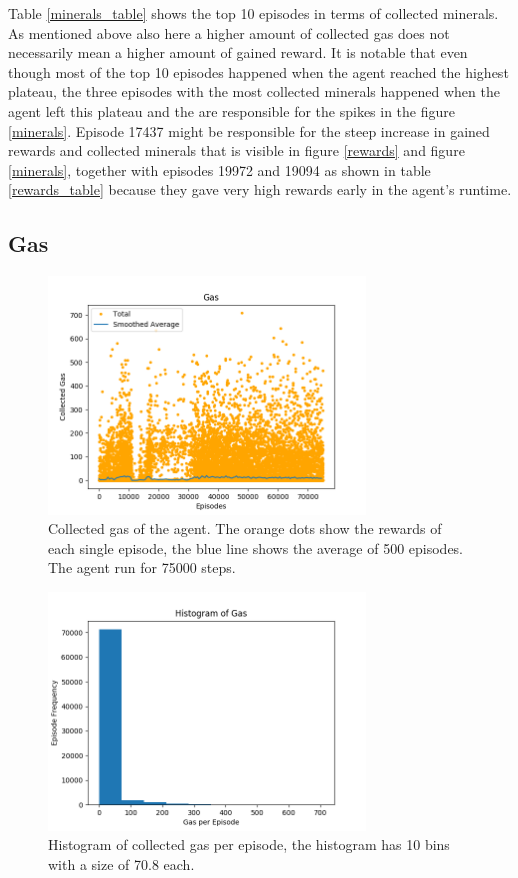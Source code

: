 \documentclass{article}
\begin{document}
Table \ref{minerals_table} shows the top 10 episodes in terms of collected 
minerals. As mentioned above also here a higher amount of collected gas does 
not necessarily mean a higher amount of gained reward. It is notable that even 
though most of the top 10 episodes happened when the agent reached the highest 
plateau, the three episodes with the most collected minerals happened when the 
agent left this plateau and the are responsible for the spikes in the figure 
\ref{minerals}. Episode 17437 might be responsible for the steep increase in 
gained rewards and collected minerals that is visible in figure \ref{rewards} 
and figure \ref{minerals}, together with episodes 19972 and 19094 as shown in 
table \ref{rewards_table} because they gave very high rewards early in the 
agent's runtime.
\subsection{Gas}
\begin{figure}
\includegraphics[width=0.75\textwidth]{gas.png}
\caption{Collected gas of the agent. The orange dots show the rewards of 
each single episode, the blue line shows the average of 500 episodes. The agent 
run for 75000 steps.}
\label{gas}
\end{figure}

\begin{figure}
\includegraphics[width=0.75\textwidth]{gas_histogram.png}
\caption{Histogram of collected gas per episode, the histogram has 10 bins with 
a size of 70.8 each.}
\label{gas_histogram}
\end{figure}
\end{document}
